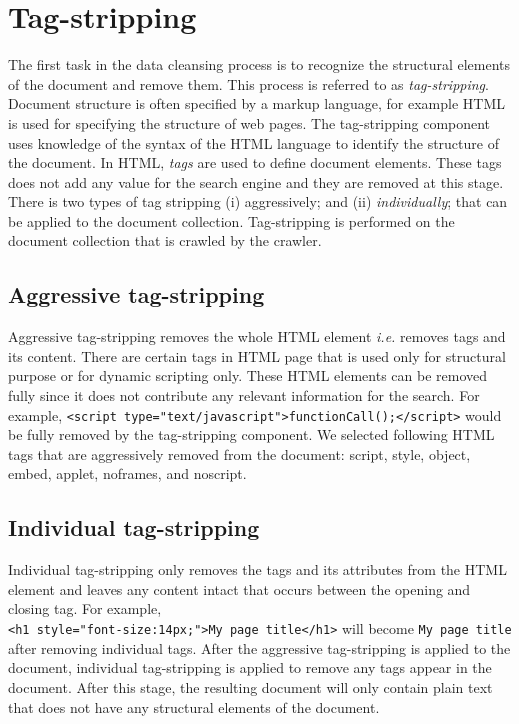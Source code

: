 \documentclass[letterpaper,11pt,twoside]{article}
\begin{document}
\section{Tag-stripping}
The first task in the data cleansing process is to recognize the structural elements of the document and remove them. This process is referred to as \emph{tag-stripping}. Document structure is often specified by a markup language, for example HTML is used for specifying the structure of web pages. The tag-stripping component uses knowledge of the syntax of the HTML language to identify the structure of the document. In HTML, \emph{tags} are used to define document elements. These tags does not add any value for the search engine and they are removed at this stage. There is two types of tag stripping (i) aggressively; and (ii) \emph{individually}; that can be applied to the document collection. Tag-stripping is performed on the document collection that is crawled by the crawler.

\subsection{Aggressive tag-stripping} 
Aggressive tag-stripping removes the whole HTML element \emph{i.e.} removes tags and its content. There are certain tags in HTML page that is used only for structural purpose or for dynamic scripting only. These HTML elements can be removed fully since it does not contribute any relevant information for the search. For example, \verb|<script type="text/javascript">functionCall();</script>| would be fully removed by the tag-stripping component. We selected following HTML tags that are aggressively removed from the document: script, style, object, embed, applet, noframes, and noscript. 

\subsection{Individual tag-stripping}
Individual tag-stripping only removes the tags and its attributes from the HTML element and leaves any content intact that occurs between the opening and closing tag. For example, \\\verb|<h1 style="font-size:14px;">My page title</h1>| will become \verb|My page title| after removing individual tags. After the aggressive tag-stripping is applied to the document, individual tag-stripping is applied to remove any tags appear in the document. After this stage, the resulting document will only contain plain text that does not have any structural elements of the document. 
\end{document}
